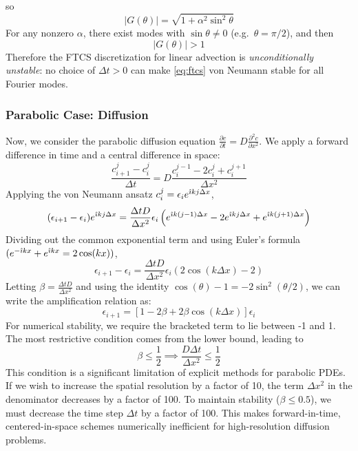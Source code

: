 so
\begin{equation}
    |G(\theta)|=\sqrt{1+\alpha^2\sin^2\theta}
    \label{eq:Gmag_ftcs}
\end{equation}
For any nonzero $\alpha$, there exist modes with $\sin\theta\neq 0$ (e.g.\ $\theta=\pi/2$), and then
\begin{equation}
    |G(\theta)|>1
\end{equation}
Therefore the FTCS discretization for linear advection is \emph{unconditionally unstable}: no choice of $\Delta t>0$ can make \autoref{eq:ftcs} von Neumann stable for all Fourier modes.


\subsubsection{Parabolic Case: Diffusion}

Now, we consider the parabolic diffusion equation $\frac{\partial c}{\partial t} = D \frac{\partial^2 c}{\partial x^2}$. We apply a forward difference in time and a central difference in space:
\begin{equation}
    \frac{c_{i+1}^j - c_i^j}{\Delta t} = D \frac{c_i^{j-1} - 2c_i^j + c_i^{j+1}}{\Delta x^2}
\end{equation}
Applying the von Neumann ansatz $c_i^j = \epsilon_i e^{\hat{\imath} k j \Delta x}$,
\begin{equation}
    (\epsilon_{i+1} - \epsilon_i) e^{\hat{\imath} k j \Delta x} = \frac{\Delta t D}{\Delta x^2} \epsilon_i \left( e^{\hat{\imath} k(j-1)\Delta x} - 2e^{\hat{\imath} k j \Delta x} + e^{\hat{\imath} k(j+1)\Delta x} \right)
\end{equation}
Dividing out the common exponential term and using Euler's formula $(e^{-\hat{\imath} kx} + e^{\hat{\imath} kx} = 2\cos(kx))$,
\begin{equation}
    \epsilon_{i+1} - \epsilon_i = \frac{\Delta t D}{\Delta x^2} \epsilon_i (2\cos(k\Delta x) - 2)
\end{equation}
Letting $\beta = \frac{\Delta t D}{\Delta x^2}$ and using the identity $\cos(\theta) - 1 = -2\sin^2(\theta/2)$, we can write the amplification relation as:
\begin{equation}
    \epsilon_{i+1} = [1 - 2\beta + 2\beta \cos(k\Delta x)] \epsilon_i
\end{equation}
For numerical stability, we require the bracketed term to lie between -1 and 1. The most restrictive condition comes from the lower bound, leading to
\begin{equation}
    \beta \le \frac{1}{2} \implies \frac{D \Delta t}{\Delta x^2} \le \frac{1}{2}
\end{equation}
This condition is a significant limitation of explicit methods for parabolic PDEs. If we wish to increase the spatial resolution by a factor of 10, the term $\Delta x^2$ in the denominator decreases by a factor of 100. To maintain stability ($\beta \le 0.5$), we must decrease the time step $\Delta t$ by a factor of 100. This makes forward-in-time, centered-in-space schemes numerically inefficient for high-resolution diffusion problems.

